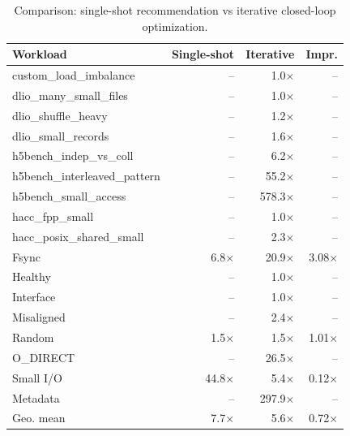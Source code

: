\begin{table}[t]
\caption{Comparison: single-shot recommendation vs iterative closed-loop optimization.}
\label{tab:trackb_vs_trackc}
\centering\small
\begin{tabular}{lrrr}
\toprule
\textbf{Workload} & \textbf{Single-shot} & \textbf{Iterative} & \textbf{Impr.} \\
\midrule
custom_load_imbalance & -- & 1.0$\times$ & -- \\
dlio_many_small_files & -- & 1.0$\times$ & -- \\
dlio_shuffle_heavy & -- & 1.2$\times$ & -- \\
dlio_small_records & -- & 1.6$\times$ & -- \\
h5bench_indep_vs_coll & -- & 6.2$\times$ & -- \\
h5bench_interleaved_pattern & -- & 55.2$\times$ & -- \\
h5bench_small_access & -- & 578.3$\times$ & -- \\
hacc_fpp_small & -- & 1.0$\times$ & -- \\
hacc_posix_shared_small & -- & 2.3$\times$ & -- \\
Fsync & 6.8$\times$ & 20.9$\times$ & 3.08$\times$ \\
Healthy & -- & 1.0$\times$ & -- \\
Interface & -- & 1.0$\times$ & -- \\
Misaligned & -- & 2.4$\times$ & -- \\
Random & 1.5$\times$ & 1.5$\times$ & 1.01$\times$ \\
O_DIRECT & -- & 26.5$\times$ & -- \\
Small I/O & 44.8$\times$ & 5.4$\times$ & 0.12$\times$ \\
Metadata & -- & 297.9$\times$ & -- \\
\midrule
Geo. mean & 7.7$\times$ & 5.6$\times$ & 0.72$\times$ \\
\bottomrule
\end{tabular}
\end{table}